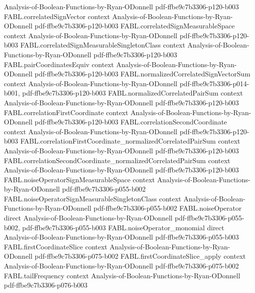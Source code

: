 \begin{theorem}
  {Analysis-of-Boolean-Functions-by-Ryan-ODonnell}
  {pdf-ffbe9c7b3306-p120-b003}
\proofstep
  {FABL.correlatedSignVector}
  {context}
  {Analysis-of-Boolean-Functions-by-Ryan-ODonnell}
  {pdf-ffbe9c7b3306-p120-b003}
\proofstep
  {FABL.correlatedSignMeasurableSpace}
  {context}
  {Analysis-of-Boolean-Functions-by-Ryan-ODonnell}
  {pdf-ffbe9c7b3306-p120-b003}
\proofstep
  {FABL.correlatedSignMeasurableSingletonClass}
  {context}
  {Analysis-of-Boolean-Functions-by-Ryan-ODonnell}
  {pdf-ffbe9c7b3306-p120-b003}
\proofstep
  {FABL.pairCoordinatesEquiv}
  {context}
  {Analysis-of-Boolean-Functions-by-Ryan-ODonnell}
  {pdf-ffbe9c7b3306-p120-b003}
\proofstep
  {FABL.normalizedCorrelatedSignVectorSum}
  {context}
  {Analysis-of-Boolean-Functions-by-Ryan-ODonnell}
  {pdf-ffbe9c7b3306-p014-b001,
    pdf-ffbe9c7b3306-p120-b003}
\proofstep
  {FABL.normalizedCorrelatedPairSum}
  {context}
  {Analysis-of-Boolean-Functions-by-Ryan-ODonnell}
  {pdf-ffbe9c7b3306-p120-b003}
\proofstep
  {FABL.correlationFirstCoordinate}
  {context}
  {Analysis-of-Boolean-Functions-by-Ryan-ODonnell}
  {pdf-ffbe9c7b3306-p120-b003}
\proofstep
  {FABL.correlationSecondCoordinate}
  {context}
  {Analysis-of-Boolean-Functions-by-Ryan-ODonnell}
  {pdf-ffbe9c7b3306-p120-b003}
\proofstep
  {FABL.correlationFirstCoordinate_normalizedCorrelatedPairSum}
  {context}
  {Analysis-of-Boolean-Functions-by-Ryan-ODonnell}
  {pdf-ffbe9c7b3306-p120-b003}
\proofstep
  {FABL.correlationSecondCoordinate_normalizedCorrelatedPairSum}
  {context}
  {Analysis-of-Boolean-Functions-by-Ryan-ODonnell}
  {pdf-ffbe9c7b3306-p120-b003}
\proofstep
  {FABL.noiseOperatorSignMeasurableSpace}
  {context}
  {Analysis-of-Boolean-Functions-by-Ryan-ODonnell}
  {pdf-ffbe9c7b3306-p055-b002}
\proofstep
  {FABL.noiseOperatorSignMeasurableSingletonClass}
  {context}
  {Analysis-of-Boolean-Functions-by-Ryan-ODonnell}
  {pdf-ffbe9c7b3306-p055-b002}
\proofstep
  {FABL.noiseOperator}
  {direct}
  {Analysis-of-Boolean-Functions-by-Ryan-ODonnell}
  {pdf-ffbe9c7b3306-p055-b002,
    pdf-ffbe9c7b3306-p055-b003}
\proofstep
  {FABL.noiseOperator_monomial}
  {direct}
  {Analysis-of-Boolean-Functions-by-Ryan-ODonnell}
  {pdf-ffbe9c7b3306-p055-b003}
\proofstep
  {FABL.firstCoordinateSlice}
  {context}
  {Analysis-of-Boolean-Functions-by-Ryan-ODonnell}
  {pdf-ffbe9c7b3306-p075-b002}
\proofstep
  {FABL.firstCoordinateSlice_apply}
  {context}
  {Analysis-of-Boolean-Functions-by-Ryan-ODonnell}
  {pdf-ffbe9c7b3306-p075-b002}
\proofstep
  {FABL.tailFrequency}
  {context}
  {Analysis-of-Boolean-Functions-by-Ryan-ODonnell}
  {pdf-ffbe9c7b3306-p076-b003}
\proofstep

\end{theorem}
